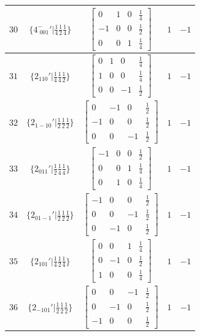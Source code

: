 \documentclass[fleqn,8pt]{jsarticle}
\begin{document}
\begin{longtable}{ccccc}
$ 30 $ & $ \{4^{-}_{\,\,001}{}'|\frac{1}{4} \frac{1}{2} \frac{1}{4}\} $ & $ \begin{bmatrix} 0 & 1 & 0 & \frac{1}{4} \\ -1 & 0 & 0 & \frac{1}{2} \\ 0 & 0 & 1 & \frac{1}{4} \end{bmatrix} $ & $ 1 $ & $ -1 $ \\ \hline
$ 31 $ & $ \{2{}_{110}{}'|\frac{1}{4} \frac{1}{4} \frac{1}{2}\} $ & $ \begin{bmatrix} 0 & 1 & 0 & \frac{1}{4} \\ 1 & 0 & 0 & \frac{1}{4} \\ 0 & 0 & -1 & \frac{1}{2} \end{bmatrix} $ & $ 1 $ & $ -1 $ \\ \hline
$ 32 $ & $ \{2{}_{1-10}{}'|\frac{1}{2} \frac{1}{2} \frac{1}{2}\} $ & $ \begin{bmatrix} 0 & -1 & 0 & \frac{1}{2} \\ -1 & 0 & 0 & \frac{1}{2} \\ 0 & 0 & -1 & \frac{1}{2} \end{bmatrix} $ & $ 1 $ & $ -1 $ \\ \hline
$ 33 $ & $ \{2{}_{011}{}'|\frac{1}{2} \frac{1}{4} \frac{1}{4}\} $ & $ \begin{bmatrix} -1 & 0 & 0 & \frac{1}{2} \\ 0 & 0 & 1 & \frac{1}{4} \\ 0 & 1 & 0 & \frac{1}{4} \end{bmatrix} $ & $ 1 $ & $ -1 $ \\ \hline
$ 34 $ & $ \{2{}_{01-1}{}'|\frac{1}{2} \frac{1}{2} \frac{1}{2}\} $ & $ \begin{bmatrix} -1 & 0 & 0 & \frac{1}{2} \\ 0 & 0 & -1 & \frac{1}{2} \\ 0 & -1 & 0 & \frac{1}{2} \end{bmatrix} $ & $ 1 $ & $ -1 $ \\ \hline
$ 35 $ & $ \{2{}_{101}{}'|\frac{1}{4} \frac{1}{2} \frac{1}{4}\} $ & $ \begin{bmatrix} 0 & 0 & 1 & \frac{1}{4} \\ 0 & -1 & 0 & \frac{1}{2} \\ 1 & 0 & 0 & \frac{1}{4} \end{bmatrix} $ & $ 1 $ & $ -1 $ \\ \hline
$ 36 $ & $ \{2{}_{-101}{}'|\frac{1}{2} \frac{1}{2} \frac{1}{2}\} $ & $ \begin{bmatrix} 0 & 0 & -1 & \frac{1}{2} \\ 0 & -1 & 0 & \frac{1}{2} \\ -1 & 0 & 0 & \frac{1}{2} \end{bmatrix} $ & $ 1 $ & $ -1 $ \\ \hline

\end{longtable}
\end{document}
